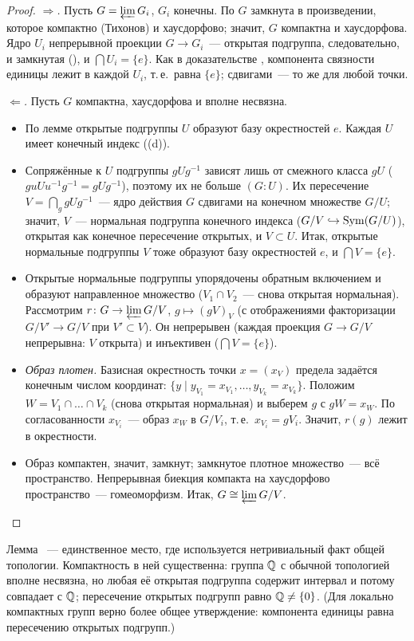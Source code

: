 \begin{proof}
\emph{$\Rightarrow$.} Пусть $G=\varprojlim G_i$, $G_i$ конечны. По  $G$ замкнута в произведении, которое компактно
(Тихонов) и хаусдорфово; значит, $G$ компактна и хаусдорфова. Ядро $U_i$ непрерывной проекции $G\to G_i$~---
открытая подгруппа, следовательно, и замкнутая (), и $\bigcap U_i=\{e\}$. Как в доказательстве , компонента
связности единицы лежит в каждой $U_i$, т.\,е.\ равна $\{e\}$; сдвигами~--- то же для любой точки.

\emph{$\Leftarrow$.} Пусть $G$ компактна, хаусдорфова и вполне несвязна.
\begin{itemize}[leftmargin=*]
\item По лемме  открытые подгруппы $U$ образуют базу окрестностей $e$. Каждая $U$ имеет конечный индекс ((d)).
\item Сопряжённые к $U$ подгруппы $gUg^{-1}$ зависят лишь от смежного класса $gU$ ($guUu^{-1}g^{-1}=gUg^{-1}$),
поэтому их не больше $(G:U)$. Их пересечение $V=\bigcap_ggUg^{-1}$~--- ядро действия $G$ сдвигами на конечном множестве
$G/U$; значит, $V$~--- нормальная подгруппа конечного индекса ($G/V\hookrightarrow\operatorname{Sym}(G/U)$), открытая как конечное
пересечение открытых, и $V\subset U$. Итак, открытые нормальные подгруппы $V$ тоже образуют базу окрестностей $e$, и
$\bigcap V=\{e\}$.
\item Открытые нормальные подгруппы упорядочены обратным включением и образуют направленное множество
($V_1\cap V_2$~--- снова открытая нормальная). Рассмотрим $r\colon G\to\varprojlim G/V$, $g\mapsto(gV)_V$ (с отображениями
факторизации $G/V'\to G/V$ при $V'\subset V$). Он непрерывен (каждая проекция $G\to G/V$ непрерывна: $V$ открыта) и
инъективен ($\bigcap V=\{e\}$).
\item \emph{Образ плотен.} Базисная окрестность точки $x=(x_V)$ предела задаётся конечным числом координат:
$\{y\mid y_{V_1}=x_{V_1},\dots,y_{V_k}=x_{V_k}\}$. Положим $W=V_1\cap\dots\cap V_k$ (снова открытая нормальная) и выберем
$g$ с $gW=x_W$. По согласованности $x_{V_i}$~--- образ $x_W$ в $G/V_i$, т.\,е.\ $x_{V_i}=gV_i$. Значит, $r(g)$ лежит в
окрестности.
\item Образ компактен, значит, замкнут; замкнутое плотное множество~--- всё пространство. Непрерывная биекция компакта на
хаусдорфово пространство~--- гомеоморфизм. Итак, $G\cong\varprojlim G/V$.\qedhere
\end{itemize}
\end{proof}

\begin{remark}
Лемма ~--- единственное место, где используется нетривиальный факт общей топологии. Компактность в ней существенна:
группа $\mathbb Q$ с обычной топологией вполне несвязна, но любая её открытая подгруппа содержит интервал и потому совпадает с
$\mathbb Q$; пересечение открытых подгрупп равно $\mathbb Q\ne\{0\}$. (Для локально компактных групп верно более общее утверждение:
компонента единицы равна пересечению открытых подгрупп.)
\end{remark}

